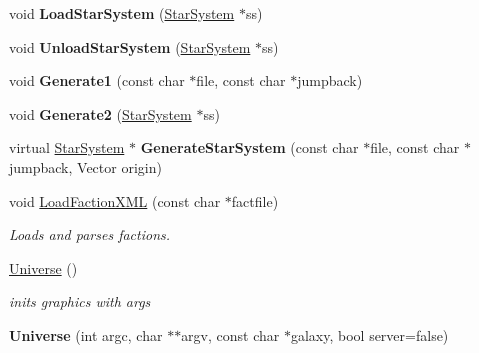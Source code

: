 \begin{DoxyCompactItemize}
\item 
void {\bfseries Load\+Star\+System} (\hyperlink{classStarSystem}{Star\+System} $\ast$ss)\hypertarget{classUniverse_a5038965876c49b7cede00dd768288534}{}\label{classUniverse_a5038965876c49b7cede00dd768288534}

\item 
void {\bfseries Unload\+Star\+System} (\hyperlink{classStarSystem}{Star\+System} $\ast$ss)\hypertarget{classUniverse_a873fe95abca9d08d7144b63aaadb2525}{}\label{classUniverse_a873fe95abca9d08d7144b63aaadb2525}

\item 
void {\bfseries Generate1} (const char $\ast$file, const char $\ast$jumpback)\hypertarget{classUniverse_aa91ce92b135df925d12eaf44281f9d82}{}\label{classUniverse_aa91ce92b135df925d12eaf44281f9d82}

\item 
void {\bfseries Generate2} (\hyperlink{classStarSystem}{Star\+System} $\ast$ss)\hypertarget{classUniverse_a5d7679e79a0612a281312d9a486fb3e8}{}\label{classUniverse_a5d7679e79a0612a281312d9a486fb3e8}

\item 
virtual \hyperlink{classStarSystem}{Star\+System} $\ast$ {\bfseries Generate\+Star\+System} (const char $\ast$file, const char $\ast$jumpback, Vector origin)\hypertarget{classUniverse_adbd2c8f430298e48e8d3ca38a169adb8}{}\label{classUniverse_adbd2c8f430298e48e8d3ca38a169adb8}

\item 
void \hyperlink{classUniverse_a921e57f524a0ded33269b24ae55513d9}{Load\+Faction\+X\+ML} (const char $\ast$factfile)\hypertarget{classUniverse_a921e57f524a0ded33269b24ae55513d9}{}\label{classUniverse_a921e57f524a0ded33269b24ae55513d9}

\begin{DoxyCompactList}\small\item\em Loads and parses factions. \end{DoxyCompactList}\item 
\hyperlink{classUniverse_a4d137a146dd3c2514dfb692dfbab6984}{Universe} ()\hypertarget{classUniverse_a4d137a146dd3c2514dfb692dfbab6984}{}\label{classUniverse_a4d137a146dd3c2514dfb692dfbab6984}

\begin{DoxyCompactList}\small\item\em inits graphics with args \end{DoxyCompactList}\item 
{\bfseries Universe} (int argc, char $\ast$$\ast$argv, const char $\ast$galaxy, bool server=false)\hypertarget{classUniverse_a914dfe559b052d0a4edc83b10103e3fb}{}\label{classUniverse_a914dfe559b052d0a4edc83b10103e3fb}


\end{DoxyCompactItemize}
